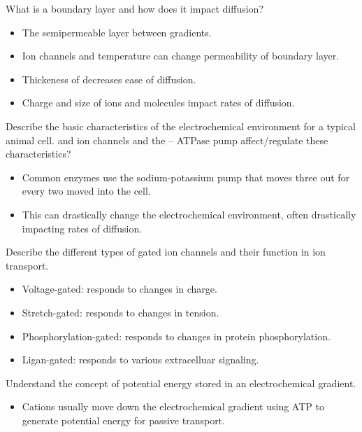 \documentclass[12pt,a4paper]{article}
\begin{document}
\begin{itemize}
\begin{itemize}
        \end{itemize}
    {\color{G-Moon}\item What is a boundary layer and how does it impact diffusion?}
        \begin{itemize}
            \item The semipermeable layer between gradients.
            \item Ion channels and temperature can change permeability of boundary layer.
            \item Thickeness of decreases ease of diffusion.
            \item Charge and size of ions and molecules impact rates of diffusion.
        \end{itemize}
    {\color{G-Moon}\item Describe the basic characteristics of the electrochemical environment for a typical animal cell.  and  ion channels and the -- ATPase pump affect/regulate these characteristics?}
        \begin{itemize}
            \item Common enzymes use the sodium-potassium pump that moves three {\color{pos}} out for every two {\color{pos}} moved into the cell. 
            \item This can drastically change the electrochemical environment, often drastically impacting rates of diffusion.
        \end{itemize}
    {\color{G-Moon}\item Describe the different types of gated ion channels and their function in ion transport.}
        \begin{itemize}
            \item Voltage-gated: responds to changes in charge.
            \item Stretch-gated: responds to changes in tension.
            \item Phosphorylation-gated: responds to changes in protein phosphorylation.
            \item Ligan-gated: responds to various extracelluar signaling.
        \end{itemize}
    {\color{G-Moon}\item Understand the concept of potential energy stored in an electrochemical gradient. }
        \begin{itemize}
            \item Cations usually move down the electrochemical gradient using ATP to generate potential energy for passive transport.

\end{itemize}
\end{itemize}
\end{document}
